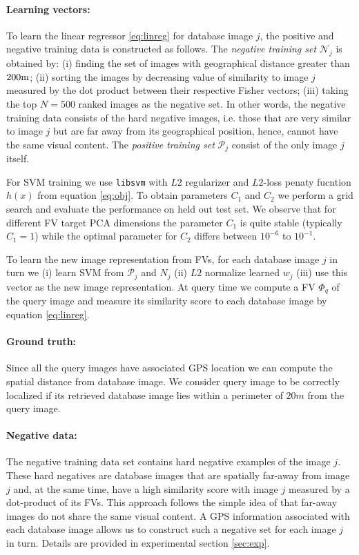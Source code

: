 \documentclass[table]{article} %
\begin{document}
	    \vspace{-4mm}
	    \paragraph{Learning vectors:}
			To learn the linear regressor \eqref{eq:linreg} for database image $j$, the positive and negative training data is constructed as follows. 
			The \emph{negative training set} $\mathcal N_j$ is obtained by: (i) finding the set of images with geographical distance greater than $200{\rm m}$; (ii)  sorting the images by decreasing value of similarity to image $j$ measured by the dot product between their respective Fisher vectors; (iii) taking the top $N=500$ ranked images as the negative set. 
			In other words, the negative training data consists of the hard negative images, i.e. those that are very similar to image $j$ but are far away from its geographical position, hence, cannot have the same visual content. The \emph{positive training set} $\mathcal P_j$ consist of the only image $j$ itself.

			For SVM training we use {\tt libsvm} \cite{libsvm} with $L2$ regularizer and $L2$-loss penaty fucntion $h(x)$ from equation \eqref{eq:obj}. To obtain parameters $C_1$ and $C_2$ we perform a grid search and evaluate the performance on held out test set. We observe that for different FV target PCA dimensions the parameter $C_1$ is quite stable (typically $C_1=1$) while the optimal parameter for $C_2$ differs between $10^{-6}$ to $10^{-1}$.

			To learn the new image representation from FVs, for each database image $j$ in turn we (i) learn SVM from $\mathcal P_j$ and $N_j$ (ii) $L2$ normalize learned $w_j$ (iii) use this vector as the new image representation. At query time we compute a FV $\Phi_q$ of the query image and measure its similarity score to each database image by equation \eqref{eq:linreg}.
		
		\vspace{-4mm}
		\paragraph{Ground truth:}
			Since all the query images have associated GPS location we can compute the spatial distance from database image. We consider query image to be correctly localized if its retrieved database image lies within a perimeter of $20m$ from the query image.


\paragraph{Negative data:}
      	The negative training data set contains hard negative examples of the image $j$. These hard negatives are database images that are spatially far-away from image $j$ and, at the same time, have a high similarity score with image $j$ measured by a dot-product of its FVs. This approach follows the simple idea of \cite{Knopp2010} that far-away images do not share the same visual content. A GPS information associated with each database image allows us to construct such a negative set for each image $j$ in turn. Details are provided in experimental section \ref{sec:exp}.
\end{document}
